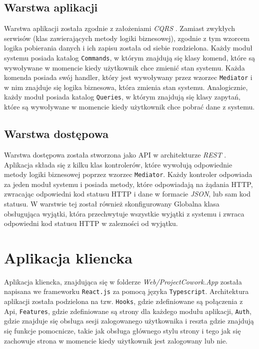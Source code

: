 \subsection{Warstwa aplikacji}
Warstwa aplikacji została zgodnie z założeniami \textit{CQRS} \cite{CQRS}. Zamiast zwykłych serwisów (klas zawierających metody logiki biznesowej), zgodnie z tym 
wzorcem logika pobierania danych i ich zapisu została od siebie rozdzielona. Każdy moduł systemu posiada katalog \texttt{Commands}, w którym znajdują się klasy komend, które są wywoływane w momencie kiedy użytkownik chce zmienić stan systemu.
Każda komenda posiada swój handler, który jest wywoływany przez wzorzec \texttt{Mediator} i w nim znajduje się logika biznesowa, która zmienia stan systemu. Analogicznie, każdy moduł posiada katalog \texttt{Queries}, w którym znajdują się klasy zapytań, które są wywoływane w momencie kiedy użytkownik chce pobrać dane z systemu.


\subsection{Warstwa dostępowa}
Warstwa dostępowa została stworzona jako API w architekturze \textit{REST} \cite{rest_redhat}. Aplikacja składa się z kilku klas kontrolerów, 
które wywołują odpowiednie metody logiki biznesowej poprzez wzorzec \texttt{Mediator}. Każdy kontroler odpowiada za jeden moduł systemu i posiada metody, które odpowiadają na żądania HTTP,
zwracając odpowiedni kod statusu HTTP i dane w formacie \textit{JSON}, lub sam kod statusu. W warstwie tej został również skonfigurowany Globalna klasa obsługująca wyjątki, która
przechwytuje wszystkie wyjątki z systemu i zwraca odpowiedni kod statusu HTTP w zalezności od wyjątku. 

\section{Aplikacja kliencka}
Aplikacja kliencka, znajdująca się w folderze \textit{Web/ProjectCowork.App} została napisana we frameworku \texttt{React.js} za pomocą języka \texttt{Typescript}.
Architektura aplikacji została podzielona na tzw. \texttt{Hooks}, gdzie zdefiniowane są połączenia z Api, 
\texttt{Features}, gdzie zdefiniowane są strony dla każdego modułu aplikacji, \texttt{Auth}, gdzie znajduje się obsługa sesji zalogowanego użytkownika
i reszta gdzie znajdują się funkcje pomocnicze, takie jak obsługa głównego
stylu strony i tego jak się zachowuje strona w momencie kiedy użytkownik jest zalogowany lub nie.
